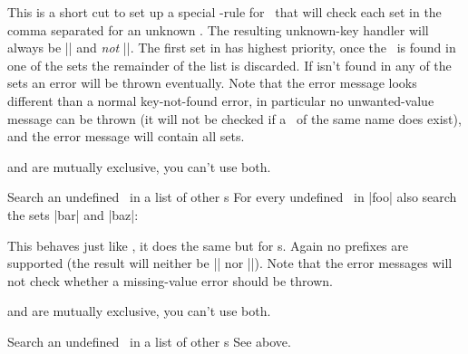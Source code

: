 \begin{function}{\ekvredirectunknown}
  \begin{syntax}
  \end{syntax}
  This is a short cut to set up a special -rule for \set\ that
  will check each set in the comma separated  for an unknown
  \Vkey. The resulting unknown-key handler will always be |\long| and \emph{not}
  |\protected|. The first set in  has highest priority, once the
  \Vkey\ is found in one of the sets the remainder of the list is discarded. If
   isn't found in any of the sets an error will be thrown eventually.
  Note that the error message looks different than a normal key-not-found error,
  in particular no unwanted-value message can be thrown (it will not be checked
  if a \Nkey\ of the same name does exist), and the error message will contain
  all sets.

   and 
  are mutually exclusive, you can't use both.
\end{function}
\begin{example}{Search an undefined \Vkey\ in a list of other \set{}s}
  For every undefined \Vkey\ in |foo| also search the sets |bar| and |baz|:
  \begin{enverb}[no-tcb]
  \end{enverb}
\end{example}

\begin{function}{\ekvredirectunknownNoVal}
  \begin{syntax}
  \end{syntax}
  This behaves just like , it does the same but for
  \Nkey{}s. Again no prefixes are supported (the result will neither be |\long|
  nor |\protected|). Note that the error messages will not check whether a
  missing-value error should be thrown.

   and 
  are mutually exclusive, you can't use both.
\end{function}
\begin{example}{Search an undefined \Nkey\ in a list of other \set{}s}
  See above.
\end{example}

